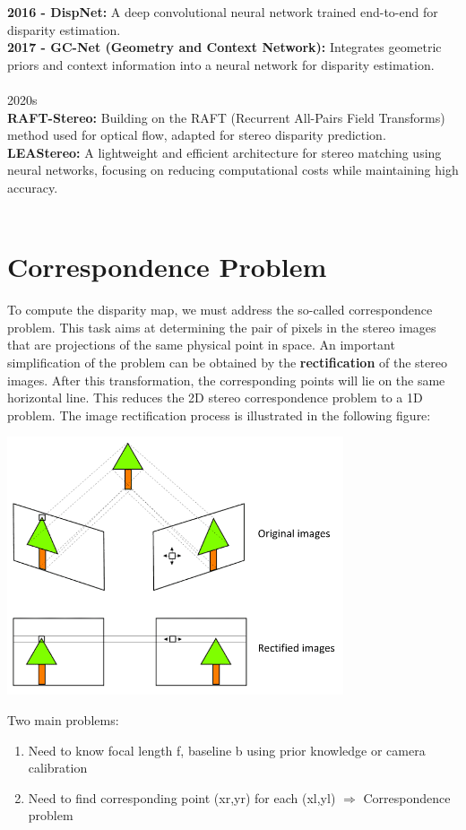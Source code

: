 \documentclass[22pt]{report}
\begin{document}
        \textbf{2016 - DispNet:} A deep convolutional neural network trained end-to-end for disparity estimation.\\
        \textbf{2017 - GC-Net (Geometry and Context Network):} Integrates geometric priors and context information into a neural network for disparity estimation.\\\\
        2020s\\
        \textbf{RAFT-Stereo:} Building on the RAFT (Recurrent All-Pairs Field Transforms) method used for optical flow, adapted for stereo disparity prediction.\\
        \textbf{LEAStereo:} A lightweight and efficient architecture for stereo matching using neural networks, focusing on reducing computational costs while maintaining high accuracy.\\\\

    \section{Correspondence Problem}
        To compute the disparity map, we must address the so-called correspondence problem. This task aims at determining the pair of pixels in the stereo images that are projections of the same physical point in space.
        An important simplification of the problem can be obtained by the \textbf{rectification} of the stereo images. After this transformation, the corresponding points will lie on the same horizontal line. This reduces the 2D stereo correspondence problem to a 1D problem.
        The image rectification process is illustrated in the following figure:
        \begin{center}
            \includegraphics[width=0.5\linewidth]{Images/Rectification.png}
        \end{center}
        Two main problems:
        \begin{enumerate}
            \item Need to know focal length f, baseline b using prior knowledge or camera calibration
            \item Need to find corresponding point (xr,yr) for each (xl,yl) $\Rightarrow$ Correspondence problem
        \end{enumerate}        
\end{document}
